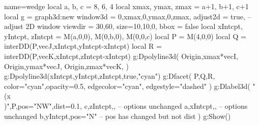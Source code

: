 \documentclass[5pt]{standalone}
\begin{document}
\begin{luadraw}{name=wedge}
    local a, b, c = 8, 6, 4
    local xmax, ymax, zmax = a+1, b+1, c+1
    local g = graph3d:new{
      window3d = {0,xmax,0,ymax,0,zmax},
      adjust2d = true,  -- adjust 2D window
      viewdir = {30,60},
      size={10,10,0},
      bbox = false
    }
    local xIntcpt, yIntcpt, zIntcpt = M(a,0,0), M(0,b,0), M(0,0,c)
    local P = M(4,0,0)
    local Q = interDD({P,vecJ},{xIntcpt,yIntcpt-xIntcpt})
    local R = interDD({P,vecK},{xIntcpt,zIntcpt-xIntcpt})
    g:Dpolyline3d({
        {Origin,xmax*vecI},
        {Origin,ymax*vecJ},
        {Origin,zmax*vecK},
      })
    g:Dpolyline3d({xIntcpt,yIntcpt,zIntcpt},true,"cyan")
    g:Dfacet(
        {P,Q,R},
        {color="cyan",opacity=0.5, edgecolor="cyan", edgestyle="dashed"}
      )
    g:Dlabel3d(
        "\\(x\\)",P,{pos="NW",dist=0.1},
        c,zIntcpt,{}, -- options unchanged
        a,xIntcpt,{}, -- options unchanged
        b,yIntcpt,{pos="N"} -- pos has changed but not dist
      )
    g:Show()
\end{luadraw}
\end{document}
